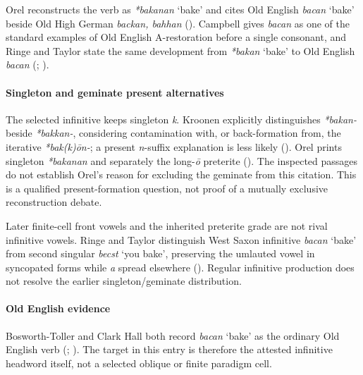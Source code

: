 \documentclass[
  british,
  a4paper,
]{article}
\providecommand{\Recon}[1]{\emph{*#1}}
\begin{document}
Orel reconstructs the verb as \Recon{bakanan} `bake' and cites Old
English {\emph{bacan}} `bake' beside Old High German \emph{backan,
bahhan} (). Campbell gives
{\emph{bacan}} as one of the standard examples of Old English
A-restoration before a single consonant, and Ringe and Taylor state the
same development from \Recon{bakan} `bake' to Old English {\emph{bacan}}
(;
).

\paragraph{Singleton and geminate present
alternatives}\label{singleton-and-geminate-present-alternatives}

The selected infinitive keeps singleton \emph{k}. Kroonen explicitly
distinguishes \emph{*bakan-} beside \emph{*bakkan-}, considering
contamination with, or back-formation from, the iterative
\emph{*bak(k)ōn-}; a present \emph{n}-suffix explanation is less likely
(). Orel prints singleton
\emph{*bakanan} and separately the long-\emph{ō} preterite
(). The inspected passages do not
establish Orel's reason for excluding the geminate from this citation.
This is a qualified present-formation question, not proof of a mutually
exclusive reconstruction debate.

Later finite-cell front vowels and the inherited preterite grade are not
rival infinitive vowels. Ringe and Taylor distinguish West Saxon
infinitive \emph{bacan} `bake' from second singular \emph{becst} `you
bake', preserving the umlauted vowel in syncopated forms while \emph{a}
spread elsewhere (). Regular infinitive production does not resolve the earlier
singleton/geminate distribution.

\paragraph{Old English evidence}\label{old-english-evidence-1}

Bosworth-Toller and Clark Hall both record {\emph{bacan}} `bake' as the
ordinary Old English verb (; ).
The target in this entry is therefore the attested infinitive headword
itself, not a selected oblique or finite paradigm cell.
\end{document}
